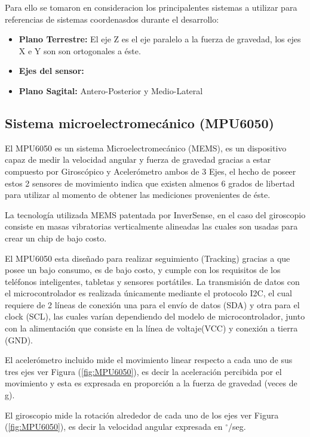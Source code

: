 \documentclass[12pt,a4paper]{article}
\newcommand{\grad}{$^{\circ}$}
\begin{document}
			Para ello se tomaron en consideracion los principalentes sistemas a utilizar para referencias de sistemas coordenasdos durante el desarrollo:
			\begin{itemize}
				\item \textbf{Plano Terrestre:} El eje Z es el eje paralelo a la fuerza de gravedad, los ejes X e Y son son ortogonales a éste.
				\item \textbf{Ejes del sensor:}
				\item \textbf{Plano Sagital:} Antero-Posterior y Medio-Lateral
				
			\end{itemize}
			
			\subsection{Sistema microelectromecánico (MPU6050)}
			El MPU6050\cite{MPU6050} es un sistema Microelectromecánico (MEMS), es un dispositivo capaz de medir la velocidad angular y fuerza de gravedad gracias a estar compuesto por Giroscópico y Acelerómetro ambos de 3 Ejes, el hecho de poseer estos 2 sensores de movimiento indica que existen almenos 6 grados de libertad para utilizar al momento de obtener las mediciones provenientes de éste.
			
			La tecnología utilizada MEMS patentada por InverSense, en el caso del giroscopio consiste en masas vibratorias verticalmente alineadas las cuales son usadas para crear un chip de bajo costo.
			
			El MPU6050 esta diseñado para realizar seguimiento (Tracking) gracias a que posee un bajo consumo, es de bajo costo, y cumple con los requisitos de los teléfonos inteligentes, tabletas y sensores portátiles.
			La transmisión de datos con el microcontrolador es realizada únicamente mediante el protocolo I2C, el cual requiere de 2 líneas de conexión una para el envío de datos (SDA) y otra para el clock (SCL), las cuales varían dependiendo del modelo de microcontrolador, junto con la alimentación que consiste en la línea de voltaje(VCC) y conexión a tierra (GND).
			
			El acelerómetro incluido mide el movimiento linear respecto a cada uno de sus tres ejes ver Figura (\ref{fig:MPU6050}), es decir la aceleración percibida por el movimiento y esta es expresada en proporción a la fuerza de gravedad (veces de g).
			
			El giroscopio mide la rotación alrededor de cada uno de los ejes ver Figura (\ref{fig:MPU6050}), es decir la velocidad angular expresada en \grad/seg.
			
\end{document}

